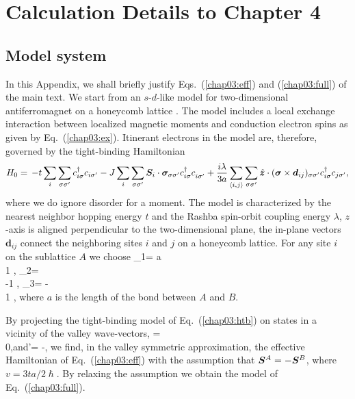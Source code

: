 \chapter{Calculation Details to Chapter 4}
\section{Model system}\label{chap03:sec:appa}

In this Appendix, we shall briefly justify Eqs.~(\ref{chap03:eff}) and (\ref{chap03:full}) of the main text. We start from an $s$-$d$-like model for two-dimensional antiferromagnet on a honeycomb lattice \cite{sumit2019}. The model includes a local exchange interaction between localized magnetic moments and conduction electron spins as given by Eq.~(\ref{chap03:ex}). Itinerant electrons in the model are, therefore, governed by the tight-binding Hamiltonian 
\begin{equation}
\label{chap03:htb}
H_0=\,-t\sum\limits_{i}\s_{\sigma\sigma'}c_{i\sigma}^\dagger c_{i\sigma'}
-J \s_{i} \s_{\sigma\sigma'}\bb{S}_i\cdot \bb{\sigma}_{\sigma\sigma'}c^\dagger_{i\sigma}c\0_{i\sigma'}+\frac{i\lambda}{3a}\s_{\langle i,j\rangle}\sum\limits_{\sigma\sigma'}\hat{\bm{z}}\cdot(\bm{\sigma}\times\bm{d}_{ij})_{\sigma\sigma'}c_{i\sigma}^\dagger c_{j\sigma'},
\end{equation}
where we do ignore disorder for a moment. The model is characterized by the nearest neighbor hopping energy $t$ and the Rashba spin-orbit coupling energy $\lambda$, $z$-axis is aligned perpendicular to the two-dimensional plane, the in-plane vectors $\bm{d}_{ij}$ connect the neighboring sites $i$ and $j$ on a honeycomb lattice. For any site $i$ on the sublattice $A$ we choose
\be
{}_{1}= a  \\ 1 \epm, \quad {}_{2}=  \bpm {} \\ -1 \epm , \quad {}_{3}= - \bpm {}  \\ 1 \epm,
\e
where $a$ is the length of the bond between $A$ and $B$.

By projecting the tight-binding model of Eq.~(\ref{chap03:htb}) on states in a vicinity of the valley wave-vectors,
\be
{}= \\ 0\epm,\quad\mbox{and}\quad {}'= -,
\e
we find, in the valley symmetric approximation, the effective Hamiltonian of Eq.~(\ref{chap03:eff}) with the assumption that $\boldsymbol{S}^A=-\boldsymbol{S}^B$, where $v = 3ta/2\hslash$. By relaxing the assumption we obtain the model of Eq.~(\ref{chap03:full}).

